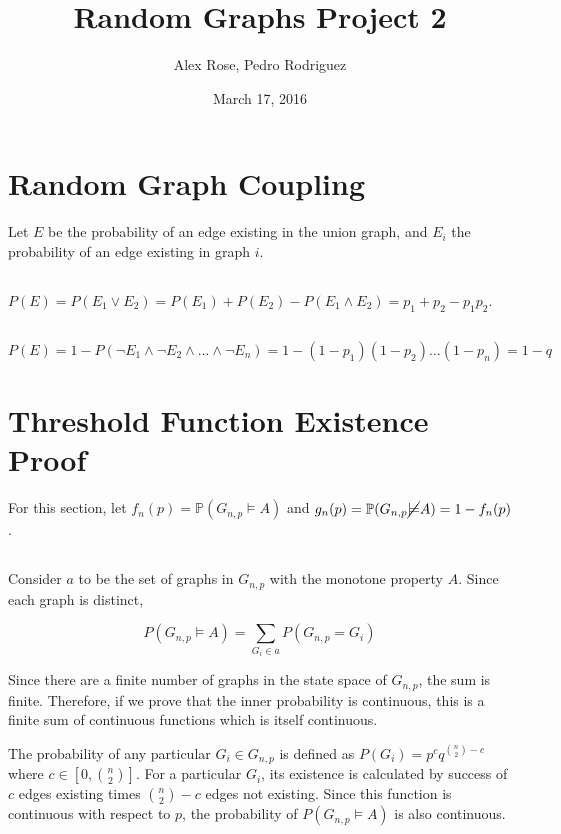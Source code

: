 \documentclass{article}
\title{Random Graphs Project 2}
\author{Alex Rose, Pedro Rodriguez}
\date{March 17, 2016}
\begin{document}
\maketitle

\section{Random Graph Coupling}

Let $E$ be the probability of an edge existing in the union graph, and $E_i$ the probability of an edge existing in graph $i$.

\subsection{}
$P(E) = P(E_1 \lor E_2) = P(E_1) + P(E_2) - P(E_1 \land E_2) = p_1 + p_2 -p_1p_2$.

\subsection{}
$P(E) = 1 - P(\neg E_1 \land \neg E_2 \land ... \land \neg E_n) = 1 - (1-p_1)(1-p_2)...(1-p_n) = 1 - q$ 


\section{Threshold Function Existence Proof}

For this section, let $f_n(p) = \mathbb{P}(G_{n,p} \models A)$ and $g_n(p) = \mathbb{P}(G_{n,p} \cancel{\models} A) = 1 - f_n(p)$.

\subsection{}
Consider $a$ to be the set of graphs in $G_{n,p}$ with the monotone property $A$. Since each graph is distinct,

$$P(G_{n,p}\vDash A)=\sum_{G_i\in a} P(G_{n,p}=G_i)$$

Since there are a finite number of graphs in the state space of $G_{n,p}$, the sum is finite. Therefore, if we prove that the inner probability is continuous, this is a finite sum of continuous functions which is itself continuous.

The probability of any particular $G_i\in G_{n,p}$ is defined as $P(G_i)=p^{c}q^{{n\choose 2}-c}$ where $c\in [0,{n\choose 2}]$. For a particular $G_i$, its existence is calculated by success of $c$ edges existing times ${n\choose 2}-c$ edges not existing. Since this function is continuous with respect to $p$, the probability of $P(G_{n,p}\vDash A)$ is also continuous.
\end{document}
